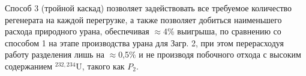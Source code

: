 Способ 3 (тройной каскад) позволяет задействовать все требуемое количество регенерата на каждой перегрузке, а также позволяет добиться наименьшего расхода природного урана, обеспечивая $\approx$4\% выигрыша, по сравнению со способом 1 на этапе производства урана для Загр. 2, при этом перерасходуя работу разделения лишь на $\approx$0,5\% и не производя побочного отхода с высоким содержанием $^{232,234}$U, такого как $P_2$.




\clearpage

